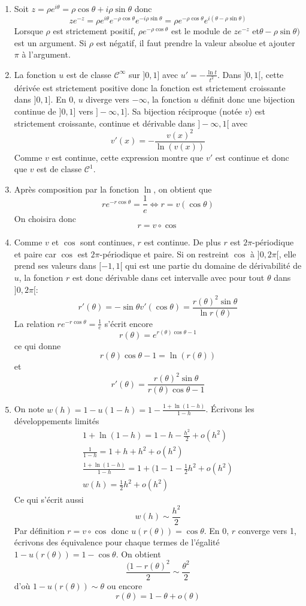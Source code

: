\begin{enumerate}
  \item Soit $z=\rho e^{i\theta}=\rho \cos\theta+i\rho\sin\theta$
  donc
  \[ze^{-z}=\rho e^{i\theta}e^{-\rho\cos\theta}e^{-i\rho\sin\theta}=\rho e^{-\rho \cos\theta} e^{i(\theta-\rho \sin \theta)}\]
   Lorsque $\rho$ est strictement positif, $\rho e^{-\rho \cos\theta}$ est le module de $ze^{-z}$
   et$\theta-\rho \sin \theta)$ est un argument. Si $\rho$ est
   n{\'e}gatif, il faut prendre la valeur absolue et ajouter $\pi$ {\`a}
   l'argument.
  \item La fonction $u$ est de classe $\mathcal{C}^{\infty}$ sur
  $]0,1]$ avec $u'=-\frac{\ln t}{t^2}$. Dans $]0,1[$, cette
  d{\'e}riv{\'e}e est strictement positive donc la fonction est strictement
  croissante dans $]0,1]$. En 0, $u$ diverge vers $-\infty$, la
  fonction $u$ d{\'e}finit donc une bijection continue de $]0,1]$ vers
  $]-\infty,1]$. Sa bijection r{\'e}ciproque (not{\'e}e $v$) est strictement
  croissante, continue et d{\'e}rivable dans $]-\infty,1[$ avec
  \[v'(x)=-\frac{v(x)^2}{\ln(v(x))}\]
  Comme $v$ est continue, cette expression montre que $v'$ est
  continue et donc que $v$ est de classe $\mathcal{C}^1$.
  \item Apr{\`e}s composition par la fonction $\ln$, on obtient
  que
  \[re^{-r\cos\theta}=\frac{1}{e}\Leftrightarrow r=v(\cos \theta)\]
  On  choisira donc
  \[r=v\circ \cos\]
  \item Comme $v$ et $\cos$ sont continues, $r$ est continue. De
  plus $r$ est $2\pi$-p{\'e}riodique et paire car $\cos$ est $2\pi$-p{\'e}riodique et
  paire. Si on restreint $\cos$ {\`a} $]0,2\pi[$, elle prend ses
  valeurs dans $[-1,1[$ qui est une partie du domaine de
  d{\'e}rivabilit{\'e} de $u$, la fonction $r$ est donc d{\'e}rivable dans cet
  intervalle avec pour tout $\theta$ dans $]0,2\pi[$:
  \[r'(\theta)=-\sin \theta v'(\cos \theta)=\frac{r(\theta)^2\sin \theta}{\ln r(\theta)}\]
  La relation $re^{-r\cos\theta}=\frac{1}{e}$ s'{\'e}crit encore
  \[r(\theta)=e^{r(\theta)\cos \theta-1}\]
  ce qui donne
  \[r(\theta)\cos \theta-1=\ln(r(\theta))\]
  et
  \[r'(\theta)=\frac{r(\theta)^2\sin \theta}{r(\theta)\cos \theta -1}\]
  \item On note $w(h)=1-u(1-h)=1-\frac{1+\ln(1-h)}{1-h}$.
  \'Ecrivons les d{\'e}veloppements limit{\'e}s
  \begin{eqnarray*}
  1+\ln(1-h)=1-h-\frac{h^2}{2}+o(h^2)\\
  \frac{1}{1-h}=1+h+h^2+o(h^2)\\
  \frac{1+\ln(1-h)}{1-h}=1+(1-1-\frac{1}{2}h^2+o(h^2)\\
  w(h)=\frac{1}{2}h^2+o(h^2)
  \end{eqnarray*}
  Ce qui s'{\'e}crit aussi
  \[w(h)\sim \frac{h^2}{2}\]
  Par d{\'e}finition $r = v \circ \cos $ donc $u(r(\theta))= \cos \theta$.
  En 0, $r$ converge vers 1, {\'e}crivons des {\'e}quivalence pour chaque
  termes de l'{\'e}galit{\'e} $1-u(r(\theta))= 1-\cos \theta$. On obtient
  \[\frac{(1-r(\theta)^2}{2}\sim\frac{\theta^2}{2}\]
  d'o{\`u} $1-u(r(\theta))\sim \theta$ ou encore
  \[r(\theta)=1-\theta+o(\theta)\]
\end{enumerate}
